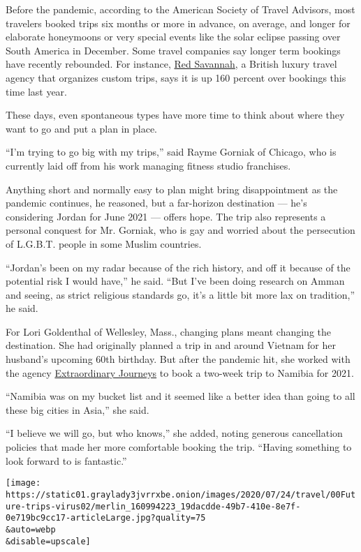 Before the pandemic, according to the American Society of Travel
Advisors, most travelers booked trips six months or more in advance, on
average, and longer for elaborate honeymoons or very special events like
the solar eclipse passing over South America in December. Some travel
companies say longer term bookings have recently rebounded. For
instance, \href{https://www.redsavannah.com/}{Red Savannah}, a British
luxury travel agency that organizes custom trips, says it is up 160
percent over bookings this time last year.

These days, even spontaneous types have more time to think about where
they want to go and put a plan in place.

``I'm trying to go big with my trips,'' said Rayme Gorniak of Chicago,
who is currently laid off from his work managing fitness studio
franchises.

Anything short and normally easy to plan might bring disappointment as
the pandemic continues, he reasoned, but a far-horizon destination ---
he's considering Jordan for June 2021 --- offers hope. The trip also
represents a personal conquest for Mr. Gorniak, who is gay and worried
about the persecution of L.G.B.T. people in some Muslim countries.

``Jordan's been on my radar because of the rich history, and off it
because of the potential risk I would have,'' he said. ``But I've been
doing research on Amman and seeing, as strict religious standards go,
it's a little bit more lax on tradition,'' he said.

For Lori Goldenthal of Wellesley, Mass., changing plans meant changing
the destination. She had originally planned a trip in and around Vietnam
for her husband's upcoming 60th birthday. But after the pandemic hit,
she worked with the agency
\href{https://extraordinaryjourneys.com/}{Extraordinary Journeys} to
book a two-week trip to Namibia for 2021.

``Namibia was on my bucket list and it seemed like a better idea than
going to all these big cities in Asia,'' she said.

``I believe we will go, but who knows,'' she added, noting generous
cancellation policies that made her more comfortable booking the trip.
``Having something to look forward to is fantastic.''

\texttt{[image: https://static01.graylady3jvrrxbe.onion/images/2020/07/24/travel/00Future-trips-virus02/merlin\_160994223\_19dacdde-49b7-410e-8e7f-0e719bc9cc17-articleLarge.jpg?quality=75\\\&auto=webp\\\&disable=upscale]}

